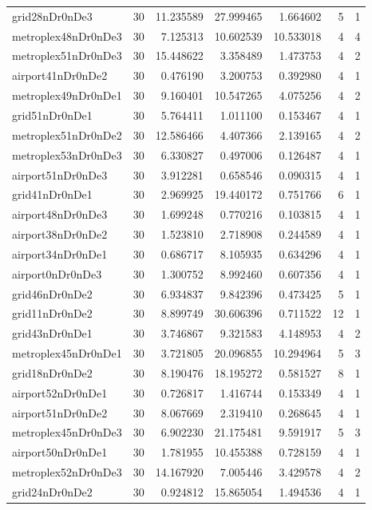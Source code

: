 \begin{longtable}{|l|r|r|r|r|r|r|}
grid28nDr0nDe3 & 30 & 11.235589 & 27.999465 & 1.664602 & 5 & 1 \\
metroplex48nDr0nDe3 & 30 & 7.125313 & 10.602539 & 10.533018 & 4 & 4 \\
metroplex51nDr0nDe3 & 30 & 15.448622 & 3.358489 & 1.473753 & 4 & 2 \\
airport41nDr0nDe2 & 30 & 0.476190 & 3.200753 & 0.392980 & 4 & 1 \\
metroplex49nDr0nDe1 & 30 & 9.160401 & 10.547265 & 4.075256 & 4 & 2 \\
grid51nDr0nDe1 & 30 & 5.764411 & 1.011100 & 0.153467 & 4 & 1 \\
metroplex51nDr0nDe2 & 30 & 12.586466 & 4.407366 & 2.139165 & 4 & 2 \\
metroplex53nDr0nDe3 & 30 & 6.330827 & 0.497006 & 0.126487 & 4 & 1 \\
airport51nDr0nDe3 & 30 & 3.912281 & 0.658546 & 0.090315 & 4 & 1 \\
grid41nDr0nDe1 & 30 & 2.969925 & 19.440172 & 0.751766 & 6 & 1 \\
airport48nDr0nDe3 & 30 & 1.699248 & 0.770216 & 0.103815 & 4 & 1 \\
airport38nDr0nDe2 & 30 & 1.523810 & 2.718908 & 0.244589 & 4 & 1 \\
airport34nDr0nDe1 & 30 & 0.686717 & 8.105935 & 0.634296 & 4 & 1 \\
airport0nDr0nDe3 & 30 & 1.300752 & 8.992460 & 0.607356 & 4 & 1 \\
grid46nDr0nDe2 & 30 & 6.934837 & 9.842396 & 0.473425 & 5 & 1 \\
grid11nDr0nDe2 & 30 & 8.899749 & 30.606396 & 0.711522 & 12 & 1 \\
grid43nDr0nDe1 & 30 & 3.746867 & 9.321583 & 4.148953 & 4 & 2 \\
metroplex45nDr0nDe1 & 30 & 3.721805 & 20.096855 & 10.294964 & 5 & 3 \\
grid18nDr0nDe2 & 30 & 8.190476 & 18.195272 & 0.581527 & 8 & 1 \\
airport52nDr0nDe1 & 30 & 0.726817 & 1.416744 & 0.153349 & 4 & 1 \\
airport51nDr0nDe2 & 30 & 8.067669 & 2.319410 & 0.268645 & 4 & 1 \\
metroplex45nDr0nDe3 & 30 & 6.902230 & 21.175481 & 9.591917 & 5 & 3 \\
airport50nDr0nDe1 & 30 & 1.781955 & 10.455388 & 0.728159 & 4 & 1 \\
metroplex52nDr0nDe3 & 30 & 14.167920 & 7.005446 & 3.429578 & 4 & 2 \\
grid24nDr0nDe2 & 30 & 0.924812 & 15.865054 & 1.494536 & 4 & 1 \\

\end{longtable}
